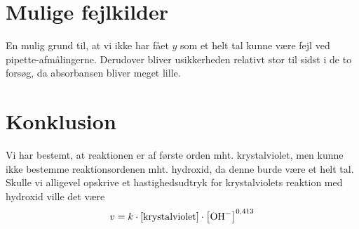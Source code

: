 \documentclass{report}
\begin{document}
\section*{Mulige fejlkilder}
En mulig grund til, at vi ikke har fået $y$ som et helt tal kunne være fejl ved pipette-afmålingerne. 
Derudover bliver usikkerheden relativt stor til sidst i de to forsøg, da absorbansen bliver meget lille.

\section*{Konklusion}
Vi har bestemt, at reaktionen er af første orden mht. krystalviolet, men kunne ikke bestemme reaktionsordenen mht. hydroxid, da denne burde være et helt tal.
Skulle vi alligevel opskrive et hastighedsudtryk for krystalviolets reaktion med hydroxid ville det være 
\[
v= k \cdot \left[\text{krystalviolet} \right]\cdot \left[\ce{OH-} \right] ^{0,413}
\] 
\end{document}
